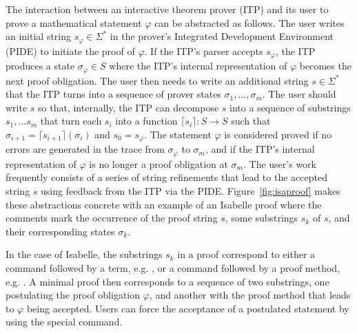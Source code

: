 \documentclass[10pt,conference]{IEEEtran}
\newcommand{\isamthd}[1]{\textcolor{IsaDarkRed}{\textbf{\texttt{#1}}}}
\newcommand{\isakw}[1]{{\bfseries\ttfamily\def\isachardot{.}\def\isacharunderscore{\isacharunderscorekeyword}%
\def\isacharbraceleft{\{}\def\isacharbraceright{\}}#1}}
\renewcommand{\isacommand}[1]{\textcolor{IsaBlue}{\isakw{#1}}}
\begin{document}
The interaction between an interactive theorem prover (ITP) and its user to prove a mathematical statement $\varphi$ can be abstracted as follows. The user writes an initial string $s_\varphi\in\Sigma^*$ in the prover's Integrated Development Environment (PIDE) to initiate the proof of $\varphi$. If the ITP's parser accepts $s_\varphi$, the ITP produces a state $\sigma_\varphi\in S$ where the ITP's internal representation of $\varphi$ becomes the next proof obligation. The user then needs to write an additional string $s\in\Sigma^*$ that the ITP turns into a sequence of prover states $\sigma_1, \dots, \sigma_m$. The user should write $s$ so that, internally, the ITP can decompose $s$ into a sequence of substrings $s_1,\dots s_m$ that turn each $s_i$ into a function $\lceil s_i\rceil: S\to S$ such that $\sigma_{i+1}=\lceil s_{i+1}\rceil(\sigma_i)$ and $s_0 = s_\varphi$. The statement $\varphi$ is considered proved if no errors are generated in the trace from $\sigma_\varphi$ to $\sigma_m$, and if the ITP's internal representation of $\varphi$ is no longer a proof obligation at $\sigma_m$. The user's work frequently consists of a series of string refinements that lead to the accepted string $s$ using feedback from the ITP via the PIDE. Figure~\ref{fig:isaproof} makes these abstractions concrete with an example of an Isabelle proof where the comments mark the occurrence of the proof string $s$, some substrings $s_k$ of $s$, and their corresponding states $\sigma_k$.

In the case of Isabelle, the substrings $s_k$ in a proof correspond to either a command followed by a term, e.g. \isa{\isacommand{have}\ {\isachardoublequoteopen}P{\isachardoublequoteclose}}, or a command followed by a proof method, e.g. \isa{\isamthd{apply} simp}. A minimal proof then corresponds to a sequence of two substrings, one postulating the proof obligation $\varphi$, and another with the proof method that leads to $\varphi$ being accepted. Users can force the acceptance of a postulated statement by using the special \isa{\isacommand{sorry}} command.
\end{document}
